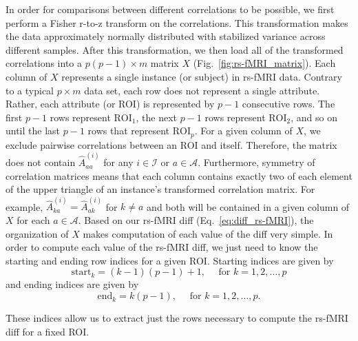 \documentclass[aos]{imsart}
\begin{document}
In order for comparisons between different correlations to be possible, we first perform a Fisher r-to-z transform on the correlations. This transformation makes the data approximately normally distributed with stabilized variance across different samples. After this transformation, we then load all of the transformed correlations into a $p(p-1) \times m$ matrix $X$ (Fig.~\ref{fig:rs-fMRI_matrix}). Each column of $X$ represents a single instance (or subject) in rs-fMRI data. Contrary to a typical $p \times m$ data set, each row does not represent a single attribute. Rather, each attribute (or ROI) is represented by $p - 1$ consecutive rows. The first $p - 1$ rows represent $\text{ROI}_1$, the next $p - 1$ rows represent $\text{ROI}_2$, and so on until the last $p - 1$ rows that represent $\text{ROI}_p$. For a given column of $X$, we exclude pairwise correlations between an ROI and itself. Therefore, the matrix does not contain $\hat{A}^{(i)}_{aa}$ for any $i \in \mathcal{I}$ or $a \in \mathcal{A}$. Furthermore, symmetry of correlation matrices means that each column contains exactly two of each element of the upper triangle of an instance's transformed correlation matrix. For example, $\hat{A}^{(i)}_{ka} = \hat{A}^{(i)}_{ak}$ for $k \neq a$ and both will be contained in a given column of $X$ for each $a \in \mathcal{A}$. Based on our rs-fMRI diff (Eq.~\ref{eq:diff_rs-fMRI}), the organization of $X$ makes computation of each value of the diff very simple. In order to compute each value of the rs-fMRI diff, we just need to know the starting and ending row indices for a given ROI. Starting indices are given by
%
\[
\text{start}_k = (k - 1)(p - 1) + 1, \quad \text{ for } k = 1,2,\dots,p
\]
%
and ending indices are given by
%
\[
\text{end}_k = k(p - 1), \quad \text{ for } k = 1,2,\dots,p.
\]

These indices allow us to extract just the rows necessary to compute the rs-fMRI diff for a fixed ROI. 
\end{document}
